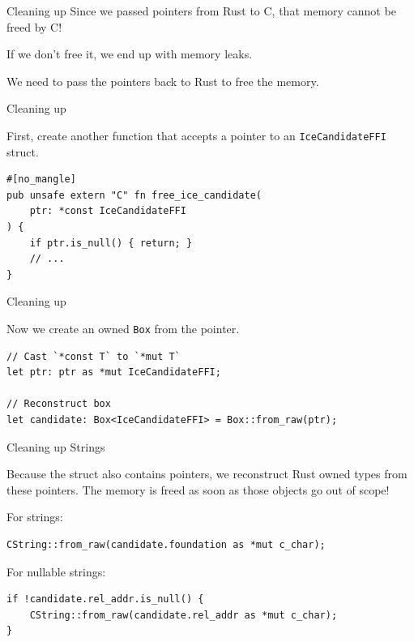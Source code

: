 \documentclass[aspectratio=1610,14pt,t]{beamer}
\begin{document}
\begin{frame}[c]{Cleaning up}
  Since we passed pointers from Rust to C, that memory cannot be freed by C!

  If we don't free it, we end up with memory leaks.

  We need to pass the pointers back to Rust to free the memory.
\end{frame}

\begin{frame}[c,fragile]{Cleaning up}

  First, create another function that accepts a pointer to an
  \texttt{IceCandidateFFI} struct.

  \begin{verbatim}
#[no_mangle]
pub unsafe extern "C" fn free_ice_candidate(
    ptr: *const IceCandidateFFI
) {
    if ptr.is_null() { return; }
    // ...
}
  \end{verbatim}
\end{frame}

\begin{frame}[c,fragile]{Cleaning up}

  Now we create an owned \texttt{Box} from the pointer.

  \begin{verbatim}
// Cast `*const T` to `*mut T`
let ptr: ptr as *mut IceCandidateFFI;

// Reconstruct box
let candidate: Box<IceCandidateFFI> = Box::from_raw(ptr);
  \end{verbatim}
\end{frame}

\begin{frame}[c,fragile]{Cleaning up Strings}

  Because the struct also contains pointers, we reconstruct Rust owned types
  from these pointers. The memory is freed as soon as those objects go out of
  scope!

  For strings:

  \begin{verbatim}
CString::from_raw(candidate.foundation as *mut c_char);
  \end{verbatim}

  For nullable strings:

  \begin{verbatim}
if !candidate.rel_addr.is_null() {
    CString::from_raw(candidate.rel_addr as *mut c_char);
}
  \end{verbatim}
\end{frame}
\end{document}
